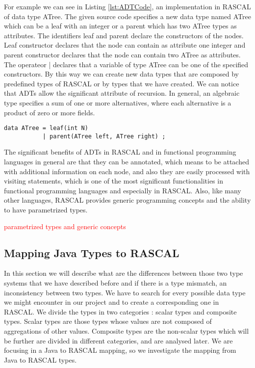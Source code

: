 For example we can see in Listing \ref{lst:ADTCode}, an implementation in RASCAL of data type ATree. The given source code specifies a new data type named ATree which can be a leaf with an integer or a parent which has two ATree types as attributes. The identifiers leaf and parent declare the constructors of the nodes. Leaf constructor declares that the node can contain as attribute one integer and parent constructor declares that the node can contain two ATree as attributes. The operateor | declares that a variable of type ATree can be one of the specified constructors. By this way we can create new data types that are composed by predefined types of RASCAL or by types that we have created. We can notice that ADTs allow the significant attribute of recursion. In general, an algebraic type specifies a sum of one or more alternatives, where each alternative is a product of zero or more fields\cite{haskelhistory}. 

\begin{lstlisting}[label=lst:ADTCode,caption=An ADT example declaring an ATree type.]
data ATree = leaf(int N)      
           | parent(ATree left, ATree right) ;
\end{lstlisting}

The significant benefits of ADTs in RASCAL and in functional programming languages in general are that they can be annotated, which means to be attached with additional information on each node, and also they are easily processed with visiting statements, which is one of the most significant functionalities in functional programming languages\cite{haskelhistory} and especially in RASCAL. Also, like many other languages, RASCAL provides generic programming concepts and the ability to have parametrized types.

\textcolor{red} {parametrized types and generic concepts}

\subsection{Mapping Java Types to RASCAL}

In this section we will describe what are the differences between those two type systems that  we have described before and if there is a type mismatch, an inconsistency between two types. We have to search for every possible data type we might encounter in our project and to create a corresponding one in RASCAL. We divide the types in two categories : scalar types and composite types. Scalar types are those types whose values are not composed of aggregations of other values\cite{paradigms}. Composite types are the non-scalar types which will be further are divided in different categories, and are analysed later. We are focusing in a Java to RASCAL mapping, so we investigate the mapping from Java to RASCAL types. 

